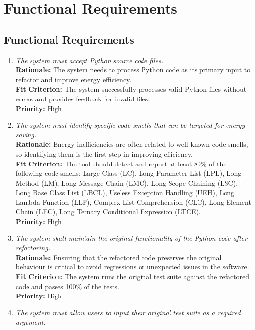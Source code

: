 \documentclass[12pt]{article}
\begin{document}
\section{Functional Requirements}
\subsection{Functional Requirements}
\begin{enumerate}[label=FR \arabic*., wide=0pt, leftmargin=*]
    \item \emph{The system must accept Python source code files.}\\[2mm]
    {\bf Rationale:} The system needs to process Python code as its primary input to refactor and improve energy efficiency.\\
    {\bf Fit Criterion:} The system successfully processes valid Python files without errors and provides feedback for invalid files.\\
    {\bf Priority:} High
    \item \emph{The system must identify specific code smells that can be targeted for energy saving.}\\[2mm]
    {\bf Rationale:} Energy inefficiencies are often related to well-known code smells, so identifying them is the first step in improving efficiency.\\
    {\bf Fit Criterion:} The tool should detect and report at least 80\% of the following code smells: Large Class (LC), Long Parameter List (LPL), Long Method (LM), Long Message Chain (LMC), Long Scope Chaining (LSC), Long Base Class List (LBCL), Useless Exception Handling (UEH), Long Lambda Function (LLF), Complex List Comprehension (CLC), Long Element Chain (LEC), Long Ternary Conditional Expression (LTCE).\\
    {\bf Priority:} High
    \item \emph{The system shall maintain the original functionality of the Python code after refactoring.}\\[2mm]
    {\bf Rationale:} Ensuring that the refactored code preserves the original behaviour is critical to avoid regressions or unexpected issues in the software.\\
    {\bf Fit Criterion:} The system runs the original test suite against the refactored code and passes 100\% of the tests.\\
    {\bf Priority:} High
    \item \emph{The system must allow users to input their original test suite as a required argument.}\\[2mm]

\end{enumerate}
\end{document}
